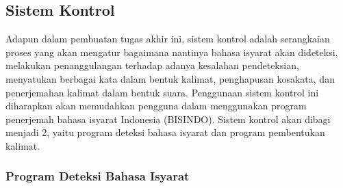 \subsection{Sistem Kontrol}
\label{sec:metodologisistemkontrol}

Adapun dalam pembuatan tugas akhir ini, sistem kontrol adalah serangkaian proses yang akan mengatur bagaimana nantinya bahasa isyarat akan dideteksi, melakukan penanggulangan terhadap adanya kesalahan pendeteksian, menyatukan berbagai kata dalam bentuk kalimat, penghapusan kosakata, dan penerjemahan kalimat dalam bentuk suara. Penggunaan sistem kontrol ini diharapkan akan memudahkan pengguna dalam menggunakan program penerjemah bahasa isyarat Indonesia (BISINDO). Sistem kontrol akan dibagi menjadi 2, yaitu program deteksi bahasa isyarat dan program pembentukan kalimat.

\subsubsection{Program Deteksi Bahasa Isyarat}

